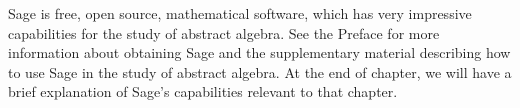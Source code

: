 Sage is free, open source, mathematical software, which has very impressive capabilities for the study of abstract algebra.  See the Preface for more information about obtaining Sage and the supplementary material describing how to use Sage in the study of abstract algebra.  At the end of chapter, we will have a brief explanation of Sage's capabilities relevant to that chapter.